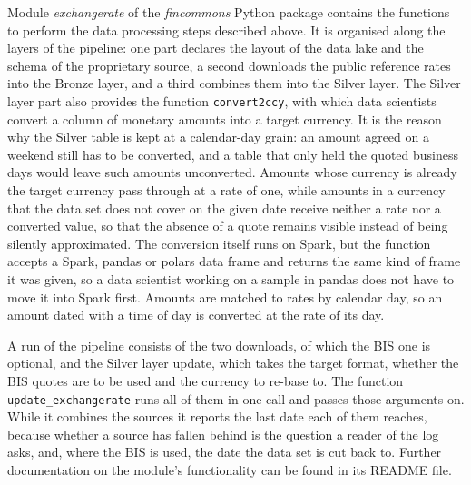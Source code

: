 Module \emph{exchangerate} of the \emph{fincommons} Python package contains the functions to perform the data processing steps described above. It is organised along the layers of the pipeline: one part declares the layout of the data lake and the schema of the proprietary source, a second downloads the public reference rates into the Bronze layer, and a third combines them into the Silver layer. The Silver layer part also provides the function \verb|convert2ccy|, with which data scientists convert a column of monetary amounts into a target currency. It is the reason why the Silver table is kept at a calendar-day grain: an amount agreed on a weekend still has to be converted, and a table that only held the quoted business days would leave such amounts unconverted. Amounts whose currency is already the target currency pass through at a rate of one, while amounts in a currency that the data set does not cover on the given date receive neither a rate nor a converted value, so that the absence of a quote remains visible instead of being silently approximated. The conversion itself runs on Spark, but the function accepts a Spark, pandas or polars data frame and returns the same kind of frame it was given, so a data scientist working on a sample in pandas does not have to move it into Spark first. Amounts are matched to rates by calendar day, so an amount dated with a time of day is converted at the rate of its day.

A run of the pipeline consists of the two downloads, of which the BIS one is optional, and the Silver layer update, which takes the target format, whether the BIS quotes are to be used and the currency to re-base to. The function \verb|update_exchangerate| runs all of them in one call and passes those arguments on. While it combines the sources it reports the last date each of them reaches, because whether a source has fallen behind is the question a reader of the log asks, and, where the BIS is used, the date the data set is cut back to. Further documentation on the module's functionality can be found in its README file.
